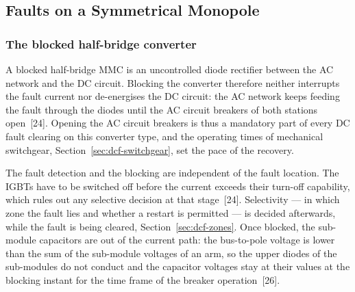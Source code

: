 \subsection{Faults on a Symmetrical Monopole}
\label{sec:dcf-faults}

\subsubsection{The blocked half-bridge converter}
\label{sec:dcf-faults-converter}

A blocked half-bridge MMC is an uncontrolled diode rectifier between the AC
network and the DC circuit. Blocking the converter therefore neither
interrupts the fault current nor de-energises the DC circuit: the AC network
keeps feeding the fault through the diodes until the AC circuit breakers of
both stations open~[24]. Opening the AC circuit breakers is thus a mandatory
part of every DC fault clearing on this converter type, and the operating
times of mechanical switchgear, Section~\ref{sec:dcf-switchgear}, set the
pace of the recovery.

The fault detection and the blocking are independent of the fault location.
The IGBTs have to be switched off before the current exceeds their turn-off
capability, which rules out any selective decision at that stage~[24].
Selectivity --- in which zone the fault lies and whether a restart is
permitted --- is decided afterwards, while the fault is being cleared,
Section~\ref{sec:dcf-zones}. Once blocked, the sub-module capacitors are out
of the current path: the bus-to-pole voltage is lower than the sum of the
sub-module voltages of an arm, so the upper diodes of the sub-modules do not
conduct and the capacitor voltages stay at their values at the blocking
instant for the time frame of the breaker operation~[26].

